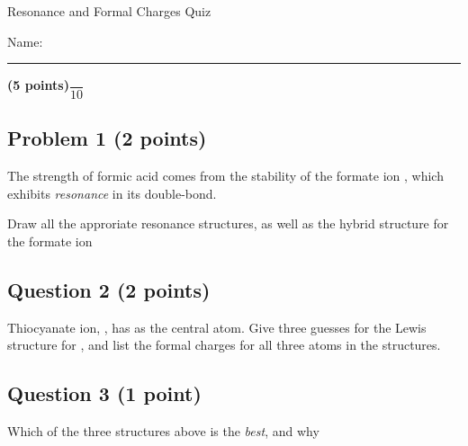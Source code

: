 \documentclass[12pt, letterpaper]{memoir}
\begin{document}
	\begin{center}
		{\large Resonance and Formal Charges Quiz}
	\end{center}
	{\large Name: \rule[-1mm]{4in}{.1pt} {\bfseries (5 points)}\hspace{4em}$\dfrac{~}{10}$} 
	
	\subsection*{Problem 1 (2 points)}
	The strength of formic acid  comes from the stability of the formate ion , which exhibits \emph{resonance} in its double-bond.
	
	\noindent Draw all the approriate resonance structures, as well as the hybrid structure for the formate ion
	
	\vspace{16em}
	\subsection*{Question 2 (2 points)}
	Thiocyanate ion, , has  as the central atom. Give three guesses for the Lewis structure for , and list the formal charges for all three atoms in the structures.
	
	\vspace{16em}
	\subsection*{Question 3 (1 point)}
	Which of the three structures above is the \emph{best}, and why
	
\end{document}
